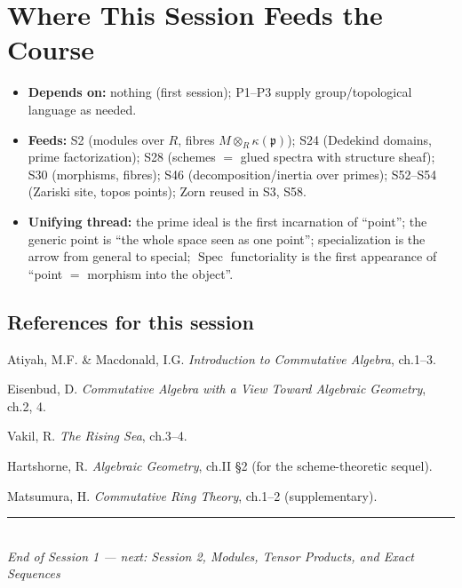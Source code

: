 \documentclass[11pt,a4paper]{article}
\theoremstyle{definition}
\newcommand{\Spec}{\operatorname{Spec}}
\newcommand{\p}{\mathfrak{p}}
\begin{document}
	\section*{Where This Session Feeds the Course}
	\begin{itemize}
		\item \textbf{Depends on:} nothing (first session); P1--P3 supply group/topological language as needed.
		\item \textbf{Feeds:} S2 (modules over $R$, fibres $M\otimes_R\kappa(\p)$); S24 (Dedekind domains,
		prime factorization); S28 (schemes $=$ glued spectra with structure sheaf); S30 (morphisms, fibres);
		S46 (decomposition/inertia over primes); S52--S54 (Zariski site, topos points); Zorn reused in S3, S58.
		\item \textbf{Unifying thread:} the prime ideal is the first incarnation of ``point''; the generic
		point is ``the whole space seen as one point''; specialization is the arrow from general to special;
		$\Spec$ functoriality is the first appearance of ``point $=$ morphism into the object''.
	\end{itemize}
	
	\subsection*{References for this session}
	\begin{enumerate}[label={[\arabic*]}]
		\item Atiyah, M.F. \& Macdonald, I.G. \emph{Introduction to Commutative Algebra}, ch.1--3.
		\item Eisenbud, D. \emph{Commutative Algebra with a View Toward Algebraic Geometry}, ch.2, 4.
		\item Vakil, R. \emph{The Rising Sea}, ch.3--4.
		\item Hartshorne, R. \emph{Algebraic Geometry}, ch.II \S2 (for the scheme-theoretic sequel).
		\item Matsumura, H. \emph{Commutative Ring Theory}, ch.1--2 (supplementary).
	\end{enumerate}
	
	\vspace{1.5em}
	\begin{center}
		\rule{0.6\textwidth}{0.4pt}\\[0.5em]
		\textit{End of Session 1 --- next: Session 2, Modules, Tensor Products, and Exact Sequences}
	\end{center}
	
\end{document}
